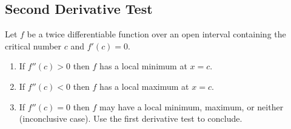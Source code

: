 \subsection{Second Derivative Test}
	Let $f$ be a twice differentiable function over an open interval containing the critical number $c$ and $f'(c) = 0$.
	\begin{enumerate}
		\item If $f''(c) > 0$ then $f$ has a local minimum at $x=c$.
		\item If $f''(c) < 0$ then $f$ has a local maximum at $x=c$.
		\item If $f''(c) = 0$ then $f$ may have a local minimum, maximum, or neither (inconclusive case). Use the first derivative test to conclude.
	\end{enumerate}
